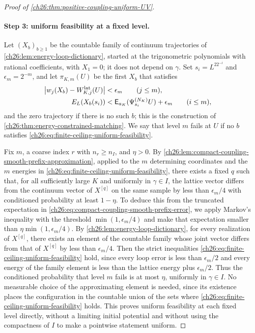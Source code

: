 \begin{proof}[Proof of \cref{ch26:thm:positive-coupling-uniform-UV}]
\paragraph{Step 3: uniform feasibility at a fixed level.}
Let $(X_b)_{b\ge1}$ be the countable family of continuum trajectories of \cref{ch26:lem:energy-loop-dictionary}, started at the trigonometric polynomials with rational coefficients, with $X_1=0$; it does not depend on $\gamma$. Set $s_i=L^22^{-i}$ and $\epsilon_m=2^{-m}$, and let $\pi_{K,m}(U)$ be the first $X_b$ that satisfies
\begin{equation}\label{ch26:eq:finite-ceiling-uniform-feasibility}
 \begin{split}
 \bigl\lvert w_j(X_b)-W^{\mathrm{lat}}_{K,j}(U)\bigr\rvert&<\epsilon_m\qquad(j\le m),\\
 E_L(X_b(s_i))&<\mathsf E_{a_K}(\Psi^{(N_K)}_{s_i}U)+\epsilon_m\qquad(i\le m),
 \end{split}
\end{equation}
and the zero trajectory if there is no such $b$; this is the construction of \cref{ch26:thm:energy-constrained-matching}. We say that level $m$ fails at $U$ if no $b$ satisfies \eqref{ch26:eq:finite-ceiling-uniform-feasibility}.

Fix $m$, a coarse index $r$ with $n_r\ge n_I$, and $\eta>0$. By \cref{ch26:lem:compact-coupling-smooth-prefix-approximation}, applied to the $m$ determining coordinates and the $m$ energies in \eqref{ch26:eq:finite-ceiling-uniform-feasibility}, there exists a fixed $q$ such that, for all sufficiently large $K$ and uniformly in $\gamma\in I$, the lattice vector differs from the continuum vector of $X^{[q]}$ on the same sample by less than $\epsilon_m/4$ with conditioned probability at least $1-\eta$. To deduce this from the truncated expectation in \eqref{ch26:eq:compact-coupling-smooth-prefix-error}, we apply Markov's inequality with the threshold $\min(1,\epsilon_m/4)$ and make that expectation smaller than $\eta\min(1,\epsilon_m/4)$. By \cref{ch26:lem:energy-loop-dictionary}, for every realization of $X^{[q]}$, there exists an element of the countable family whose joint vector differs from that of $X^{[q]}$ by less than $\epsilon_m/4$. Then the strict inequalities \eqref{ch26:eq:finite-ceiling-uniform-feasibility} hold, since every loop error is less than $\epsilon_m/2$ and every energy of the family element is less than the lattice energy plus $\epsilon_m/2$. Thus the conditioned probability that level $m$ fails is at most $\eta$, uniformly in $\gamma\in I$. No measurable choice of the approximating element is needed, since its existence places the configuration in the countable union of the sets where \eqref{ch26:eq:finite-ceiling-uniform-feasibility} holds. This proves uniform feasibility at each fixed level directly, without a limiting initial potential and without using the compactness of $I$ to make a pointwise statement uniform.


\end{proof}
